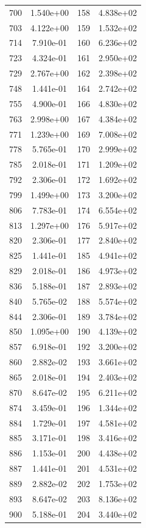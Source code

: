 \documentclass[12pt]{article}
\begin{document}
\begin{longtable}{@{}cccc@{}}
700 & 1.540e+00 & 158 & 4.838e+02 \\
703 & 4.122e+00 & 159 & 1.532e+02 \\
714 & 7.910e-01 & 160 & 6.236e+02 \\
723 & 4.324e-01 & 161 & 2.950e+02 \\
729 & 2.767e+00 & 162 & 2.398e+02 \\
748 & 1.441e-01 & 164 & 2.742e+02 \\
755 & 4.900e-01 & 166 & 4.830e+02 \\
763 & 2.998e+00 & 167 & 4.384e+02 \\
771 & 1.239e+00 & 169 & 7.008e+02 \\
778 & 5.765e-01 & 170 & 2.999e+02 \\
785 & 2.018e-01 & 171 & 1.209e+02 \\
792 & 2.306e-01 & 172 & 1.692e+02 \\
799 & 1.499e+00 & 173 & 3.200e+02 \\
806 & 7.783e-01 & 174 & 6.554e+02 \\
813 & 1.297e+00 & 176 & 5.917e+02 \\
820 & 2.306e-01 & 177 & 2.840e+02 \\
825 & 1.441e-01 & 185 & 4.941e+02 \\
829 & 2.018e-01 & 186 & 4.973e+02 \\
836 & 5.188e-01 & 187 & 2.893e+02 \\
840 & 5.765e-02 & 188 & 5.574e+02 \\
844 & 2.306e-01 & 189 & 3.784e+02 \\
850 & 1.095e+00 & 190 & 4.139e+02 \\
857 & 6.918e-01 & 192 & 3.200e+02 \\
860 & 2.882e-02 & 193 & 3.661e+02 \\
865 & 2.018e-01 & 194 & 2.403e+02 \\
870 & 8.647e-02 & 195 & 6.211e+02 \\
874 & 3.459e-01 & 196 & 1.344e+02 \\
884 & 1.729e-01 & 197 & 4.581e+02 \\
885 & 3.171e-01 & 198 & 3.416e+02 \\
886 & 1.153e-01 & 200 & 4.438e+02 \\
887 & 1.441e-01 & 201 & 4.531e+02 \\
889 & 2.882e-02 & 202 & 1.753e+02 \\
893 & 8.647e-02 & 203 & 8.136e+02 \\
900 & 5.188e-01 & 204 & 3.440e+02 \\

\end{longtable}
\end{document}
